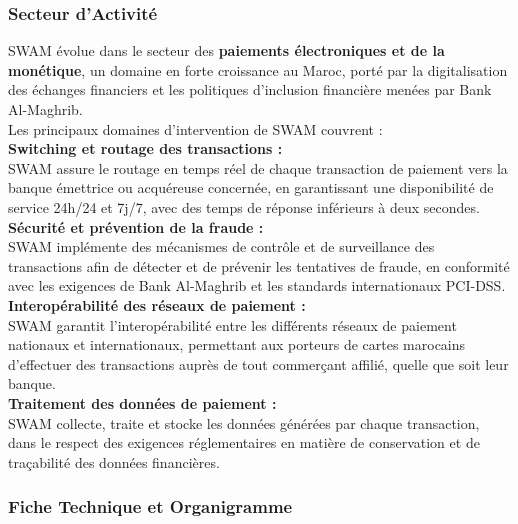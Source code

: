 \subsubsection{Secteur d'Activité}
\vspace{0.3cm}
SWAM évolue dans le secteur des \textbf{paiements électroniques et de la monétique}, un domaine en forte croissance au Maroc, porté par la digitalisation des échanges financiers et les politiques d'inclusion financière menées par Bank Al-Maghrib.
\\[0.3cm]
Les principaux domaines d'intervention de SWAM couvrent :
\\[0.2cm]
\textbf{Switching et routage des transactions :}\\
SWAM assure le routage en temps réel de chaque transaction de paiement vers la banque émettrice ou acquéreuse concernée, en garantissant une disponibilité de service 24h/24 et 7j/7, avec des temps de réponse inférieurs à deux secondes.
\vspace{0.3cm}\\
\textbf{Sécurité et prévention de la fraude :}\\
SWAM implémente des mécanismes de contrôle et de surveillance des transactions afin de détecter et de prévenir les tentatives de fraude, en conformité avec les exigences de Bank Al-Maghrib et les standards internationaux PCI-DSS.
\vspace{0.3cm}\\
\textbf{Interopérabilité des réseaux de paiement :}\\
SWAM garantit l'interopérabilité entre les différents réseaux de paiement nationaux et internationaux, permettant aux porteurs de cartes marocains d'effectuer des transactions auprès de tout commerçant affilié, quelle que soit leur banque.
\vspace{0.3cm}\\
\textbf{Traitement des données de paiement :}\\
SWAM collecte, traite et stocke les données générées par chaque transaction, dans le respect des exigences réglementaires en matière de conservation et de traçabilité des données financières.

\newpage
\subsubsection{Fiche Technique et Organigramme}
\vspace{0.3cm}

